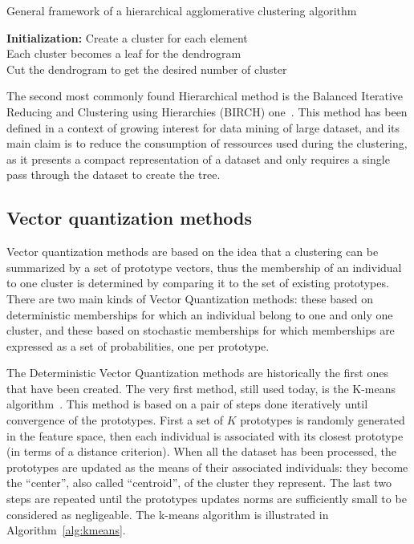     \begin{algorithm}[H]
        \caption{General framework of a hierarchical agglomerative clustering algorithm}
        \textbf{Initialization:} Create a cluster for each element\\
        Each cluster becomes a leaf for the dendrogram\\
        Cut the dendrogram to get the desired number of cluster
\label{alg:hierarch}
    \end{algorithm}

    \vspace{0.8cm}

    The second most commonly found Hierarchical method is the Balanced Iterative Reducing and Clustering using Hierarchies (BIRCH) one~\cite{zhang1997birch}. This method has been defined in a context of growing interest for data mining of large dataset, and its main claim is to reduce the consumption of ressources used during the clustering, as it presents a compact representation of a dataset and only requires a single pass through the dataset to create the tree.

    \subsection{Vector quantization methods}
\label{sec:cluster_vector_quantization}

    Vector quantization methods are based on the idea that a clustering can be 
    summarized by a set of prototype vectors, thus the membership of an 
    individual to one cluster is determined by comparing it to the set of 
    existing prototypes.  There are two main kinds of Vector Quantization 
    methods: these based on deterministic memberships for which an individual 
    belong to one and only one cluster, and these based on stochastic 
    memberships for which memberships are expressed as a set of probabilities, 
    one per prototype. 

    The Deterministic Vector Quantization methods are historically the first ones that have been created. The very first method, still used today, is the K-means algorithm~\cite{macqueen1967some}. This method is based on a pair of steps done iteratively until convergence of the prototypes. First a set of $K$ prototypes is randomly generated in the feature space, then each individual is associated with its closest prototype (in terms of a distance criterion). When all the dataset has been processed, the prototypes are updated as the means of their associated individuals: they become the ``center'', also called ``centroid'',  of the cluster they represent. The last two steps are repeated until the prototypes updates norms are sufficiently small to be considered as negligeable. The k-means algorithm is illustrated in Algorithm~\ref{alg:kmeans}.

